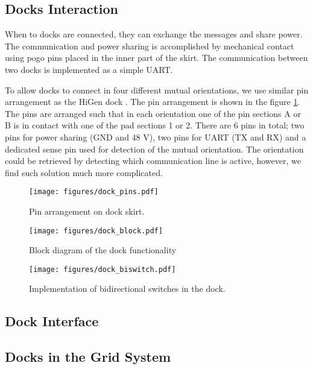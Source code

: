 \subsection{Docks Interaction}

When to docks are connected, they can exchange the messages and share power. The
communication and power sharing is accomplished by mechanical contact using pogo
pins placed in the inner part of the skirt. The communication between two docks
is implemented as a simple UART.

To allow docks to connect in four different mutual orientations, we use similar
pin arrangement as the HiGen dock \cite{parrott_higen:_2014}. The pin
arrangement is shown in the figure \ref{fig:dock_pins}. The pins are arranged
such that in each orientation one of the pin sections A or B is in contact with
one of the pad sections 1 or 2. There are 6 pins in total; two pins for power
sharing (GND and 48 V), two pins for UART (TX and RX) and a dedicated sense pin
used for detection of the mutual orientation. The orientation could be retrieved
by detecting which communication line is active, however, we find such solution
much more complicated.


\begin{figure}[t]
    \centering
    \texttt{[image: figures/dock\_pins.pdf]}
    \caption{Pin arrangement on dock skirt. }
    \label{fig:dock_pins}
\end{figure}

\begin{figure}[t]
    \centering
    \texttt{[image: figures/dock\_block.pdf]}
    \caption{Block diagram of the dock functionality}
    \label{fig:dock_block}
\end{figure}

\begin{figure}[t]
    \centering
    \texttt{[image: figures/dock\_biswitch.pdf]}
    \caption{Implementation of bidirectional switches in the dock.}
    \label{fig:dock_biswitch}
\end{figure}


\subsection{Dock Interface}



\subsection{Docks in the Grid System}\label{sec:dock_in_grid}

